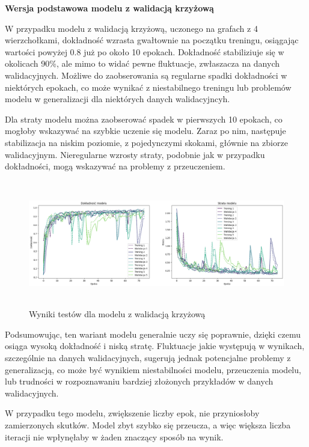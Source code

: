 \textbf{Wersja podstawowa modelu z walidacją krzyżową}

W przypadku modelu z walidacją krzyżową, uczonego na grafach z 4 wierzchołkami,
dokładność wzrasta gwałtownie na początku treningu,
osiągając wartości powyżej 0.8 już po około 10 epokach.
Dokładność stabiliziuje się w okolicach 90\%, ale mimo to widać pewne fluktuacje, zwłaszacza na danych walidacyjnych.
Możliwe do zaobserowania są regularne spadki dokładności w niektórych epokach,
co może wynikać z niestabilnego treningu lub problemów modelu w generalizacji dla niektórych danych walidacyjncyh.

Dla straty modelu można zaobserować spadek w pierwszych 10 epokach, co mogłoby wskazywać na szybkie uczenie się modelu.
Zaraz po nim, następuje stabilizacja na niskim poziomie, z pojedynczymi skokami, głównie na zbiorze walidacyjnym.
Nieregularne wzrosty straty, podobnie jak w przypadku dokładności, mogą wskazywać na problemy z przeuczeniem.

\begin{figure}[ht]
	\centering
	\includegraphics[height=5.5cm]{resources/tests/images/v3/crossvalid_img.png}
	\caption{Wyniki testów dla modelu z walidacją krzyżową}
	\label{Fig:tests-cv-0a}
\end{figure}
\FloatBarrier

Podsumowując, ten wariant modelu generalnie uczy się poprawnie, dzięki czemu osiąga wysoką dokładność i niską stratę.
Fluktuacje jakie występują w wynikach, szczególnie na danych walidacyjnych,
sugerują jednak potencjalne problemy z generalizacją, co może być wynikiem niestabilności modelu,
przeuczenia modelu, lub trudności w rozpoznawaniu bardziej złożonych przykładów w danych walidacyjnych.

W przypadku tego modelu, zwiększenie liczby epok, nie przyniosłoby zamierzonych skutków.
Model zbyt szybko się przeucza, a więc większa liczba iteracji nie wpłynęłaby w żaden znaczący sposób na wynik.

